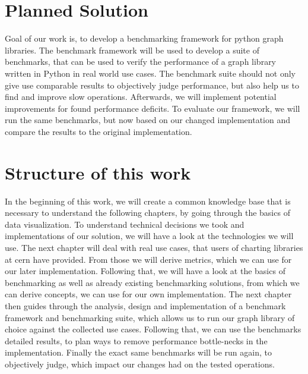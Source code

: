 
\section{Planned Solution}
\label{sec:Introduction:problem}

Goal of our work is, to develop a benchmarking framework for python graph
libraries.  The benchmark framework will be used to develop a suite of
benchmarks, that can be used to verify the performance of a graph library
written in Python in real world use cases. The benchmark suite should not only
give use comparable results to objectively judge performance, but also help us
to find and improve slow operations.  Afterwards, we will implement potential
improvements for found performance deficits. To evaluate our framework, we will
run the same benchmarks, but now based on our changed implementation and compare
the results to the original implementation.
  




\section{Structure of this work}
\label{sec:Introduction:problem}


In the beginning of this work, we will create a common knowledge base that is
necessary to understand the following chapters, by going through the basics of
data visualization. To understand technical decisions we took and
implementations of our solution, we will have a look at the technologies we will
use. The next chapter will deal with real use cases, that users of charting
libraries at \gls{cern} have provided. From those we will derive metrics, which
we can use for our later implementation. Following that, we will have a look at
the basics of benchmarking as well as already existing benchmarking solutions,
from which we can derive concepts, we can use for our own implementation. The
next chapter then guides through the analysis, design and implementation of a
benchmark framework and benchmarking suite, which allows us to run our graph
library of choice against the collected use cases. Following that, we can use
the benchmarks detailed results, to plan ways to remove performance bottle-necks
in the implementation. Finally the exact same benchmarks will be run again, to
objectively judge, which impact our changes had on the tested operations.

